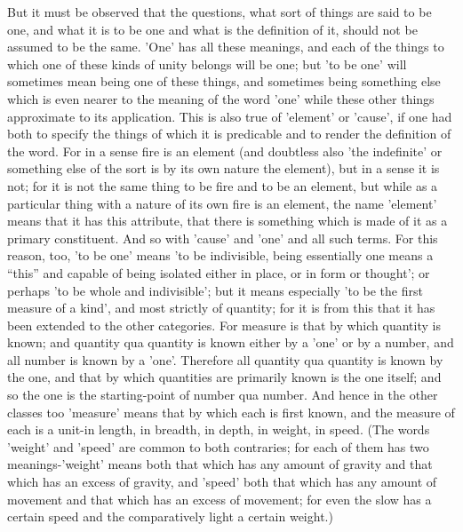 But it must be observed that the questions, what sort of things are said to be one, and what it is to be one and what is the definition of it, should not be assumed to be the same. 'One' has all these meanings, and each of the things to which one of these kinds of unity belongs will be one; but 'to be one' will sometimes mean being one of these things, and sometimes being something else which is even nearer to the meaning of the word 'one' while these other things approximate to its application. This is also true of 'element' or 'cause', if one had both to specify the things of which it is predicable and to render the definition of the word. For in a sense fire is an element (and doubtless also 'the indefinite' or something else of the sort is by its own nature the element), but in a sense it is not; for it is not the same thing to be fire and to be an element, but while as a particular thing with a nature of its own fire is an element, the name 'element' means that it has this attribute, that there is something which is made of it as a primary constituent. And so with 'cause' and 'one' and all such terms. For this reason, too, 'to be one' means 'to be indivisible, being essentially one means a ``this'' and capable of being isolated either in place, or in form or thought'; or perhaps 'to be whole and indivisible'; but it means especially 'to be the first measure of a kind', and most strictly of quantity; for it is from this that it has been extended to the other categories. For measure is that by which quantity is known; and quantity qua quantity is known either by a 'one' or by a number, and all number is known by a 'one'. Therefore all quantity qua quantity is known by the one, and that by which quantities are primarily known is the one itself; and so the one is the starting-point of number qua number. And hence in the other classes too 'measure' means that by which each is first known, and the measure of each is a unit-in length, in breadth, in depth, in weight, in speed. (The words 'weight' and 'speed' are common to both contraries; for each of them has two meanings-'weight' means both that which has any amount of gravity and that which has an excess of gravity, and 'speed' both that which has any amount of movement and that which has an excess of movement; for even the slow has a certain speed and the comparatively light a certain weight.)

